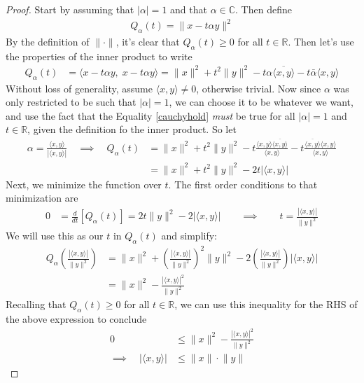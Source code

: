 \documentclass[12pt]{book}
\numberwithin{equation}{section} %
\theoremstyle{plain}
\theoremstyle{definition}
\theoremstyle{remark}
\newcommand{\R}{\mathbb{R}}
\begin{document}
\begin{proof}
Start by assuming that $|\alpha|=1$ and that $\alpha\in\mathbb{C}$. Then
define
\begin{align*}
  Q_\alpha(t) = \lVert x - t\alpha y\rVert^2
\end{align*}
By the definition of $\lVert \cdot\rVert$, it's clear that
$Q_\alpha(t)\geq 0$ for all $t\in\mathbb{R}$. Then let's use the
properties of the inner product to write
\begin{align}
    Q_\alpha(t) &= \langle x -t\alpha y,\; x -t\alpha y\rangle
    = \lVert x\rVert^2 + t^2 \lVert y\rVert^2
    - t\alpha \overline{\langle x,y\rangle}
    - t\bar{\alpha} {\langle x,y\rangle} \label{cauchyhold}
\end{align}
Without loss of generality, assume $\langle x,y\rangle\neq 0$, otherwise
trivial. Now since $\alpha$ was only restricted to be such that
$|\alpha|=1$, we can choose it to be whatever we want, and use the fact
that the Equality \ref{cauchyhold} \emph{must} be true for all
$|\alpha|=1$ and $t\in\mathbb{R}$, given the definition fo the inner
product. So let
\begin{align*}
    \alpha = \frac{\langle x,y\rangle}{|\langle x,y\rangle|}
    \quad\implies\quad
    Q_\alpha(t) &= \lVert x\rVert^2 + t^2 \lVert y\rVert^2
    - t\frac{\langle x,y\rangle\overline{\langle x,y\rangle}}{\langle x,y\rangle}
    - t\frac{\overline{\langle x,y\rangle}{\langle x,y\rangle}}{\langle x,y\rangle}  \\
    &= \lVert x\rVert^2 + t^2 \lVert y\rVert^2
    -2t |\langle x,y\rangle|
\end{align*}
Next, we minimize the function over $t$. The first order conditions to
that minimization are
\begin{align*}
  0 &= \frac{d}{dt}[Q_\alpha(t)]
    = 2t \lVert y\rVert^2 -2 |\langle x,y\rangle|
  \qquad\implies\qquad
  t = \frac{|\langle x,y\rangle|}{\lVert y\rVert^2}
\end{align*}
We will use this as our $t$ in $Q_\alpha(t)$ and simplify:
\begin{align*}
  Q_\alpha\left(
  \frac{|\langle x,y\rangle|}{\lVert y\rVert^2}
  \right)
  &= \lVert x\rVert^2 +
  \left(\frac{|\langle x,y\rangle|}{\lVert y\rVert^2}\right)^2
  \lVert y\rVert^2
  -2
  \left(\frac{|\langle x,y\rangle|}{\lVert y\rVert^2}\right)
  |\langle x,y\rangle| \\
  &= \lVert x\rVert^2
  - \frac{|\langle x,y\rangle|^2}{\lVert y\rVert^2}
\end{align*}
Recalling that $Q_\alpha(t)\geq 0$ for all $t\in\R$, we can use this
inequality for the RHS of the above expression to conclude
\begin{align*}
  0 &\leq
   \lVert x\rVert^2
  - \frac{|\langle x,y\rangle|^2}{\lVert y\rVert^2} \\
  \implies\quad
  |\langle x,y\rangle| &\leq
   \lVert x\rVert \cdot \lVert y\rVert
\end{align*}
\end{proof}
\end{document}
